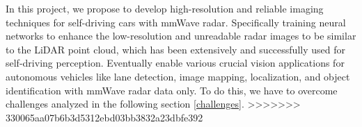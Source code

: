 In this project, we propose to develop high-resolution and reliable imaging techniques for self-driving cars with mmWave radar. Specifically training neural networks to enhance the low-resolution and unreadable radar images to be similar to the LiDAR point cloud, which has been extensively and successfully used for self-driving perception. Eventually enable various crucial vision applications for autonomous vehicles like lane detection, image mapping, localization, and object identification with mmWave radar data only. To do this, we have to overcome challenges analyzed in the following section \ref{challenges}.
>>>>>>> 330065aa07b6b3d5312ebd03bb3832a23dbfe392
 
